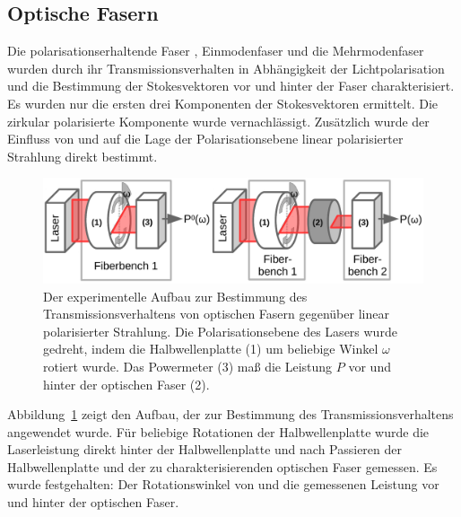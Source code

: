 \documentclass[a4paper,12pt,twoside,parskip=no,headsepline,open=right,ngerman,export]{scrreprt}
\begin{document}
            
            
            \subsection*{Optische Fasern}\label{subsec:method_fibre}
            
            Die polarisationserhaltende Faser , Einmodenfaser  und die Mehrmodenfaser  wurden durch ihr Transmissionsverhalten in Abhängigkeit der Lichtpolarisation und die Bestimmung der Stokesvektoren vor und hinter der Faser charakterisiert. Es wurden nur die ersten drei Komponenten der Stokesvektoren ermittelt. Die zirkular polarisierte Komponente wurde vernachlässigt. Zusätzlich wurde der Einfluss von  und  auf die Lage der Polarisationsebene linear polarisierter Strahlung direkt bestimmt.
            
            \begin{figure}[!b]
                \center
                \includegraphics[width=\textwidth]{img/aufbau_faser_transmission.pdf}
                \caption[Transmissionsverhalten von optischen Fasern]{Der experimentelle Aufbau zur Bestimmung des Transmissionsverhaltens von optischen Fasern gegenüber linear polarisierter Strahlung. Die Polarisationsebene des Lasers wurde gedreht, indem die Halbwellenplatte (1) um beliebige Winkel $\omega$ rotiert wurde. Das Powermeter (3) maß die Leistung $P$ vor und hinter der optischen Faser (2).}
                \label{fig:method_transmissionFaser}
            \end{figure}
            
            Abbildung~\ref{fig:method_transmissionFaser} zeigt den Aufbau, der zur Bestimmung des Transmissionsverhaltens angewendet wurde. Für beliebige Rotationen der Halbwellenplatte  wurde die Laserleistung direkt hinter der Halbwellenplatte und nach Passieren der Halbwellenplatte und der zu charakterisierenden optischen Faser gemessen. Es wurde festgehalten: Der Rotationswinkel von  und die gemessenen Leistung vor und hinter der optischen Faser.
        
\end{document}
